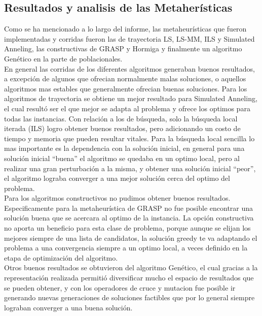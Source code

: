 \documentclass[letterpaper,11pt]{article}
\begin{document}
\subsection{Resultados y analisis de las Metaher\'isticas}

Como se ha mencionado a lo largo del informe, las metaheur\'isticas que fueron implementadas y corridas fueron las de trayectoria LS, LS-MM, ILS y Simulated Anneling, las constructivas de GRASP y Hormiga y finalmente un algoritmo Gen\'etico en la parte de poblacionales.\\

En general las corridas de los diferentes algoritmos generaban buenos resultados, a excepci\'on de algunos que ofrecian normalmente malas soluciones, o aquellos algoritmos mas estables que generalmente ofrecian buenas soluciones. Para los algoritmos de trayectoria se obtiene un mejor resultado para Simulated Anneling, el cual result\'o ser el que mejor se adapta al problema y ofrece los optimos para todas las instancias. Con relaci\'on a los de b\'usqueda, solo la b\'usqueda local iterada (ILS) logro obtener buenos resultados, pero adicionando un costo de tiempo y memoria que pueden resultar vitales. Para la b\'usqueda local sencilla lo mas importante es la dependencia con la soluci\'on inicial, en general para una soluci\'on inicial ``buena'' el algoritmo se quedaba en un optimo local, pero al realizar una gran perturbaci\'on a la misma, y obtener una soluci\'on inicial ``peor'', el algoritmo lograba converger a una mejor soluci\'on cerca del optimo del problema.\\

Para los algoritmos constructivos no pudimos obtener buenos resultados. Especificamente para la metaheur\'istica de GRASP no fue posible encontrar una soluci\'on buena que se acercara al optimo de la instancia. La opci\'on constructiva no aporta un beneficio para esta clase de problema, porque aunque se elijan los mejores siempre de una lista de candidatos, la soluci\'on greedy te va adaptando el problema a una convergencia siempre a un optimo local, a veces definido en la etapa de optimizaci\'on del algoritmo.\\

Otros buenos resultados se obtuvieron del algoritmo Gen\'etico, el cual gracias a la representaci\'on realizada permiti\'o diversificar mucho el espacio de resultados que se pueden obtener, y con los operadores de cruce y mutacion fue posible ir generando nuevas generaciones de soluciones factibles que por lo general siempre lograban converger a una buena soluci\'on.
\end{document}
